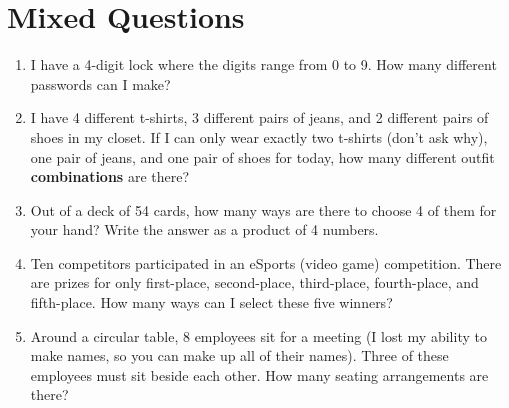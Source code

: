 \documentclass[11pt]{extarticle}
\begin{document}
\section{Mixed Questions}
\begin{enumerate}
    \itemsep 3.5em
    \item {I have a 4-digit lock where the digits range from 0 to 9. How many different passwords can I make?}
    \item {I have 4 different t-shirts, 3 different pairs of jeans, and 2 different pairs of shoes in my closet. If I can only wear exactly two t-shirts (don't ask why), one pair of jeans, and one pair of shoes for today, how many different outfit \textbf{combinations} are there?}
    \item {Out of a deck of 54 cards, how many ways are there to choose 4 of them for your hand? Write the answer as a product of 4 numbers.}
    \item {Ten competitors participated in an eSports (video game) competition. There are prizes for only first-place, second-place, third-place, fourth-place, and fifth-place. How many ways can I select these five winners?}
    \item {Around a circular table, 8 employees sit for a meeting (I lost my ability to make names, so you can make up all of their names). Three of these employees must sit beside each other. How many seating arrangements are there?}
\end{enumerate}
\end{document}
